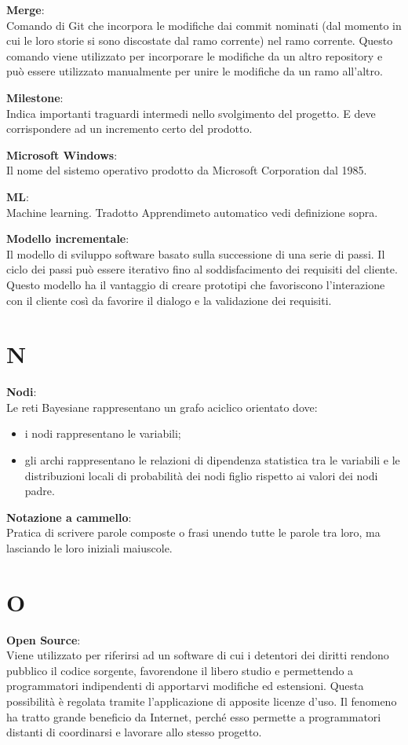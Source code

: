 \documentclass[a4paper, oneside, openany, dvipsnames, table]{article}
\begin{document}
\textbf{Merge}:\\	Comando di Git che incorpora le modifiche dai commit nominati (dal momento in cui le loro storie si sono discostate dal ramo corrente) nel ramo corrente. Questo comando viene utilizzato per incorporare le modifiche da un altro repository e può essere utilizzato manualmente per unire le modifiche da un ramo all'altro.

\textbf{Milestone}:\\	Indica importanti traguardi intermedi nello svolgimento del progetto. E deve corrispondere ad un incremento certo del prodotto.

\textbf{Microsoft Windows}:\\ Il nome del sistemo operativo prodotto da Microsoft Corporation dal 1985.

\textbf{ML}:\\	Machine learning. Tradotto Apprendimeto automatico vedi definizione sopra.

\textbf{Modello incrementale}:\\	Il modello di sviluppo software basato sulla successione di una serie di passi. Il ciclo dei passi può essere iterativo fino al soddisfacimento dei requisiti del cliente. Questo modello ha il vantaggio di creare prototipi che favoriscono l’interazione con il cliente così da favorire il dialogo e la validazione dei requisiti.


\newpage
\section{N}
\textbf{Nodi}:\\	Le reti Bayesiane rappresentano un grafo aciclico orientato dove:
\begin{itemize}
\item i nodi rappresentano le variabili;
\item gli archi rappresentano le relazioni di dipendenza statistica tra le variabili e le distribuzioni locali di probabilità dei nodi figlio rispetto ai valori dei nodi padre.
\end{itemize}

\textbf{Notazione a cammello}:\\	Pratica di scrivere parole composte o frasi unendo tutte le parole tra loro, ma lasciando le loro iniziali maiuscole.

\newpage
\section{O}
\textbf{Open Source}:\\	Viene utilizzato per riferirsi ad un software di cui i detentori dei diritti rendono pubblico il codice sorgente, favorendone il libero studio e permettendo a programmatori indipendenti di apportarvi modifiche ed estensioni. Questa possibilità è regolata tramite l'applicazione di apposite licenze d'uso. Il fenomeno ha tratto grande beneficio da Internet, perché esso permette a programmatori distanti di coordinarsi e lavorare allo stesso progetto.
\end{document}
